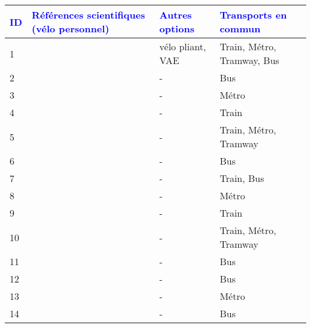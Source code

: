         \begin{longtable}{p{0.5cm}p{5.5cm}p{3cm}p{4cm}}
        \hline
        \small{\textcolor{blue}{\textbf{ID}}} & \small{\textcolor{blue}{\textbf{Références scientifiques (vélo personnel)}}} & \small{\textcolor{blue}{\textbf{Autres options}}} & \small{\textcolor{blue}{\textbf{Transports en commun}}}\\
        \hline
        \endhead
    \small{1} & \small{\textcite{abours_rapport_2015}}\index{Abours, Sylvie|pagebf} & \small{vélo pliant, VAE} & \small{Train, Métro, Tramway, Bus}\\
    \small{2} & \small{\textcite{advani_bicycle_2006}}\index{Advani, Mukti|pagebf} & \small{-} & \small{Bus}\\
    \small{3} & \small{\textcite{ann_examination_2019}}\index{Ann, Sangeetha|pagebf} & \small{-} & \small{Métro}\\
    \small{4} & \small{\textcite{arbis_analysis_2016}}\index{Arbis, David|pagebf} & \small{-} & \small{Train}\\
    \small{5} & \small{\textcite{arias_molinares_bike_2018}}\index{Arias Molinares, Daniela|pagebf} & \small{-} & \small{Train, Métro, Tramway}\\
    \small{6} & \small{\textcite{balya_integration_2016}}\index{Balya, Manjurali|pagebf} & \small{-} & \small{Bus}\\
    \small{7} & \small{\textcite{bauer_influence_2021}}\index{Bauer, Marek|pagebf} & \small{-} & \small{Train, Bus}\\
    \small{8} & \small{\textcite{bearn_adaption_2018}}\index{Bearn, Cary|pagebf} & \small{-} & \small{Métro}\\
    \small{9} & \small{\textcite{bechstein_cycling_2010}}\index{Bechstein, Eva|pagebf} & \small{-} & \small{Train}\\
    \small{10} & \small{\textcite{bopp_examining_2015}}\index{Bopp, Melissa|pagebf} & \small{-} & \small{Train, Métro, Tramway}\\
    \small{11} & \small{\textcite{brand_assessing_2015}}\index{Brand, Judith Caroline|pagebf} & \small{-} & \small{Bus}\\
    \small{12} & \small{\textcite{brand_modelling_2017}}\index{Brand, Judith Caroline|pagebf} & \small{-} & \small{Bus}\\
    \small{13} & \small{\textcite{cervero_bike-and-ride_2013}}\index{Cervero, Robert|pagebf} & \small{-} & \small{Métro}\\
    \small{14} & \small{\textcite{cervero_influences_2009}}\index{Cervero, Robert|pagebf} & \small{-} & \small{Bus}\\

\end{longtable}
